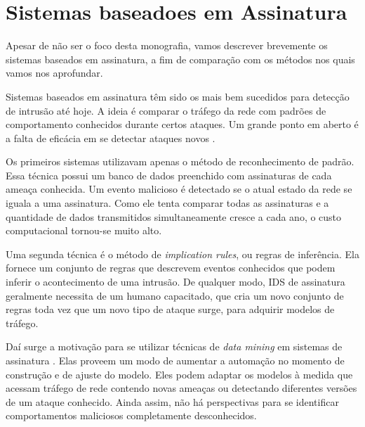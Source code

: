 \chapter{Sistemas baseadoes em Assinatura}
\label{ch:snids}
Apesar de não ser o foco desta monografia, vamos descrever brevemente os sistemas baseados em assinatura, a fim de
comparação com os métodos nos quais vamos nos aprofundar.
\par Sistemas baseados em assinatura têm sido os mais bem sucedidos para detecção de intrusão até hoje.
A ideia é comparar o tráfego da rede com padrões de comportamento conhecidos durante certos ataques.
Um grande ponto em aberto é a falta de eficácia em se detectar ataques novos \cite{holm14}.
\par Os primeiros sistemas utilizavam apenas o método de reconhecimento de padrão. Essa técnica possui um banco de dados
 preenchido com assinaturas de cada ameaça conhecida. Um evento malicioso é detectado se o atual estado da rede se iguala
 a uma assinatura. Como ele tenta comparar todas as assinaturas e a quantidade de dados transmitidos simultaneamente
cresce a cada ano, o custo computacional tornou-se muito alto.
\par Uma segunda técnica é o método de \textit{implication rules}, ou regras de inferência. Ela fornece um conjunto de
regras que descrevem eventos conhecidos que podem inferir o acontecimento de uma intrusão. De qualquer modo, IDS de
assinatura geralmente necessita de um humano capacitado, que cria um novo conjunto de regras toda vez que um novo
tipo de ataque surge, para adquirir modelos de tráfego.
\par Daí surge a motivação para se utilizar técnicas de \textit{data mining} em sistemas de assinatura \cite{han02}. Elas proveem um
 modo de aumentar a automação no momento de construção e de ajuste do modelo. Eles podem adaptar os modelos à medida que
 acessam tráfego de rede contendo novas ameaças ou detectando diferentes versões de um ataque conhecido. Ainda assim,
 não há perspectivas para se identificar comportamentos maliciosos completamente desconhecidos.